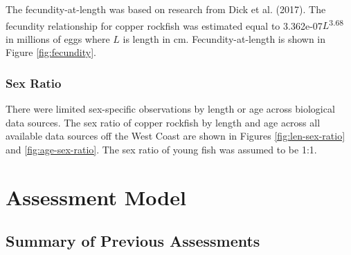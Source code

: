 \documentclass[11pt,
  english,
  a4paper,
]{article}
\begin{document}
\leavevmode\tagmcend\tagstructend\par


The fecundity-at-length was based on research from Dick et al. {(2017)\leavevmode\tagmcend\tagstructend}. The fecundity relationship for copper rockfish was estimated equal to 3.362e-07{\(L\)\leavevmode\tagmcend\tagstructend}\textsuperscript{3.68} in millions of eggs where {\(L\)\leavevmode\tagmcend\tagstructend} is length in cm. Fecundity-at-length is shown in Figure \ref{fig:fecundity}.

\leavevmode\tagmcend\tagstructend\par


\hypertarget{sex-ratio}{%
\subsubsection{Sex Ratio}\label{sex-ratio}}

\leavevmode\tagmcend\tagstructend


There were limited sex-specific observations by length or age across biological data sources. The sex ratio of copper rockfish by length and age across all available data sources off the West Coast are shown in Figures \ref{fig:len-sex-ratio} and \ref{fig:age-sex-ratio}. The sex ratio of young fish was assumed to be 1:1.

\leavevmode\tagmcend\tagstructend\par


\hypertarget{assessment-model}{%
\section{Assessment Model}\label{assessment-model}}

\leavevmode\tagmcend\tagstructend


\hypertarget{summary-of-previous-assessments}{%
\subsection{Summary of Previous Assessments}\label{summary-of-previous-assessments}}
\end{document}
